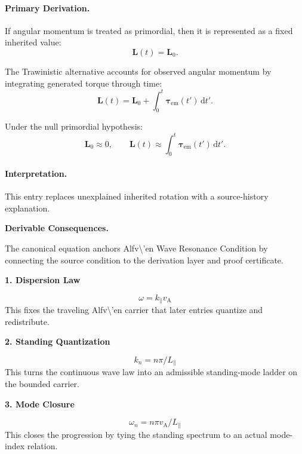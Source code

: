 \paragraph{Primary Derivation.}
If angular momentum is treated as primordial, then it is represented as a fixed inherited value:
\begin{equation}
\mathbf{L}(t)=\mathbf{L}_0.
\end{equation}

The Trawinistic alternative accounts for observed angular momentum by integrating generated torque through time:
\begin{equation}
\mathbf{L}(t)
=
\mathbf{L}_0
+
\int_0^t
\boldsymbol{\tau}_{\mathrm{em}}(t')
\,\mathrm{d}t' .
\end{equation}

Under the null primordial hypothesis:
\begin{equation}
\boxed{
\mathbf{L}_0\approx 0,
\qquad
\mathbf{L}(t)
\approx
\int_0^t
\boldsymbol{\tau}_{\mathrm{em}}(t')
\,\mathrm{d}t' .
}
\end{equation}

\paragraph{Interpretation.}
This entry replaces unexplained inherited rotation with a source-history explanation.

\par\vspace{0.35em}
\noindent\textbf{Derivable Consequences.}\quad
\begingroup
\footnotesize
\raggedright
The canonical equation anchors Alfv\textbackslash{}'en Wave Resonance Condition by connecting the source condition to the derivation layer and proof certificate.
\par\endgroup

\noindent\textbf{1. Dispersion Law}\par
\[
\omega=k_{\parallel}v_{\mathrm{A}}
\]
\noindent This fixes the traveling Alfv\textbackslash{}'en carrier that later entries quantize and redistribute.\par
\noindent\textbf{2. Standing Quantization}\par
\[
k_{n}=n\pi/L_{\parallel}
\]
\noindent This turns the continuous wave law into an admissible standing-mode ladder on the bounded carrier.\par
\noindent\textbf{3. Mode Closure}\par
\[
\omega_{n}=n\pi v_{\mathrm{A}}/L_{\parallel}
\]
\noindent This closes the progression by tying the standing spectrum to an actual mode-index relation.\par

